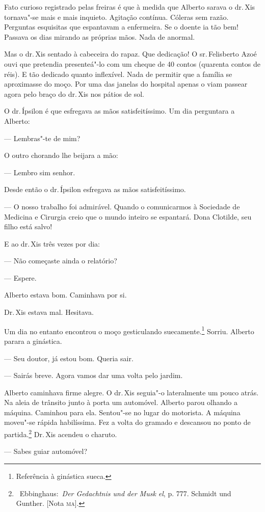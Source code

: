 \begin{linenumbers}
Fato curioso registrado pelas freiras é que à medida que Alberto sarava
o dr.\,Xis tornava"-se mais e mais inquieto. Agitação contínua. Cóleras
sem razão. Perguntas esquisitas que espantavam a enfermeira. Se o doente
ia tão bem! Passava os dias mirando as próprias mãos. Nada de anormal.

Mas o dr.\,Xis sentado à cabeceira do rapaz. Que dedicação! O sr.\,Felisberto Azoé ouvi que pretendia presenteá"-lo com um cheque de 40
contos (quarenta contos de réis). E tão dedicado quanto inflexível. Nada
de permitir que a família se aproximasse do moço. Por uma das janelas do
hospital apenas o viam passear agora pelo braço do dr.\,Xis nos pátios de
sol.

O dr.\,Ípsilon é que esfregava as mãos satisfeitíssimo. Um dia perguntara
a Alberto:

--- Lembras"-te de mim?

O outro chorando lhe beijara a mão:

--- Lembro sim senhor.

Desde então o dr.\,Ípsilon esfregava as mãos satisfeitíssimo.

--- O nosso trabalho foi admirável. Quando o comunicarmos à Sociedade de
Medicina e Cirurgia creio que o mundo inteiro se espantará. Dona
Clotilde, seu filho está salvo!

E ao dr.\,Xis três vezes por dia:

--- Não começaste ainda o relatório?

--- Espere.

Alberto estava bom. Caminhava por si.

Dr.\,Xis estava mal. Hesitava.

Um dia no entanto encontrou o moço gesticulando suecamente.\footnote{Referência
  à ginástica sueca.} Sorriu. Alberto parara a ginástica.

--- Seu doutor, já estou bom. Queria sair.

--- Sairás breve. Agora vamos dar uma volta pelo jardim.

Alberto caminhava firme alegre. O dr.\,Xis seguia"-o lateralmente um pouco
atrás. Na aleia de trânsito junto à porta um automóvel. Alberto parou
olhando a máquina. Caminhou para ela. Sentou"-se no lugar do motorista. A
máquina moveu"-se rápida habilíssima. Fez a volta do gramado e descansou
no ponto de partida.\footnote{~Ebbinghaus:~\emph{Der Gedachtnis und der
  Musk el}, p. 777. Schmidt und Gunther. {[}Nota \textsc{ma}{]}.} Dr.\,Xis
acendeu o charuto.

--- Sabes guiar automóvel?


\end{linenumbers}
